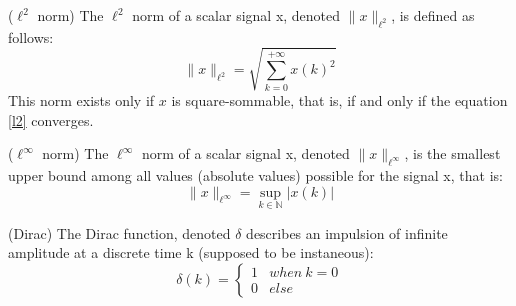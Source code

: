 	\begin{thdef}\label{l_1} ($\ell^2$ norm)
		The $\ell^2$ norm of a scalar signal x, denoted $\|x\|_{\ell^2}$, is defined as follows:
		\begin{equation} \label{l2}
				\|x\|_{\ell^2}=\sqrt{\sum_{k=0}^{+\infty}x(k)^2}
		\end{equation}
		This norm exists only if $x$ is square-sommable, that is, if and only if the equation \ref{l2} converges.
	\end{thdef}

	\begin{thdef}\label{l_inf} ($\ell^\infty$ norm)
		The $\ell^\infty$ norm of a scalar signal x, denoted $\|x\|_{\ell^\infty}$, is the smallest upper bound among all values (absolute values) possible for the signal x, that is:
		\begin{equation} \label{l3}
				\|x\|_{\ell^\infty}=\sup_{k\in \mathbb{N}}|x(k)|
		\end{equation}
	\end{thdef}

		\begin{thdef}\label{Dirac} (Dirac)
			The Dirac function, denoted $\delta$ describes an impulsion of infinite amplitude at a discrete time k (supposed to be instaneous):
			\begin{equation} \label{ir}
					\delta(k)=
					\begin{cases}
						1 & when\  k=0 \\
						0 & else
					\end{cases}
			\end{equation}
				
		\end{thdef}

